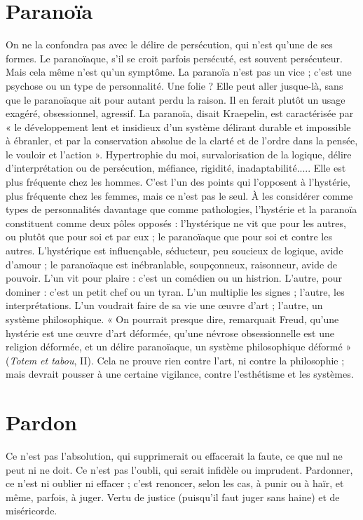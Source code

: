 \section{Paranoïa}
On ne la confondra pas avec le délire de persécution, qui n’est
qu’une de ses formes. Le paranoïaque, s’il se croit parfois persécuté,
est souvent persécuteur. Mais cela même n’est qu’un symptôme. La paranoïa
n'est pas un vice ; c’est une psychose ou un type de personnalité. Une
folie ? Elle peut aller jusque-là, sans que le paranoïaque ait pour autant perdu
la raison. Il en ferait plutôt un usage exagéré, obsessionnel, agressif. La paranoïa,
disait Kraepelin, est caractérisée par « le développement lent et insidieux
d’un système délirant durable et impossible à ébranler, et par la conservation
absolue de la clarté et de l’ordre dans la pensée, le vouloir et l’action ». Hypertrophie
du moi, survalorisation de la logique, délire d’interprétation ou de persécution,
méfiance, rigidité, inadaptabilité..... Elle est plus fréquente chez les
hommes. C’est l’un des points qui l’opposent à l’hystérie, plus fréquente chez
les femmes, mais ce n’est pas le seul. À les considérer comme types de personnalités
davantage que comme pathologies, l’hystérie et la paranoïa constituent
comme deux pôles opposés : l’hystérique ne vit que pour les autres, ou plutôt
que pour soi et par eux ; le paranoïaque que pour soi et contre les autres. L’hystérique
est influençable, séducteur, peu soucieux de logique, avide d’amour ; le
paranoïaque est inébranlable, soupçonneux, raisonneur, avide de pouvoir. L’un
vit pour plaire : c’est un comédien ou un histrion. L'autre, pour dominer : c’est
un petit chef ou un tyran. L’un multiplie les signes ; l’autre, les interprétations.
L’un voudrait faire de sa vie une œuvre d’art ; l’autre, un système philosophique.
« On pourrait presque dire, remarquait Freud, qu’une hystérie est une
œuvre d’art déformée, qu’une névrose obsessionnelle est une religion déformée, et
un délire paranoïaque, un système philosophique déformé » ({\it Totem et tabou}, II).
Cela ne prouve rien contre l’art, ni contre la philosophie ; mais devrait pousser
à une certaine vigilance, contre l’esthétisme et les systèmes.

\section{Pardon}
Ce n’est pas l’absolution, qui supprimerait ou effacerait la faute,
ce que nul ne peut ni ne doit. Ce n’est pas l’oubli, qui serait infidèle
ou imprudent. Pardonner, ce n’est ni oublier ni effacer ; c’est renoncer,
selon les cas, à punir ou à haïr, et même, parfois, à juger. Vertu de justice
(puisqu'il faut juger sans haine) et de miséricorde.

